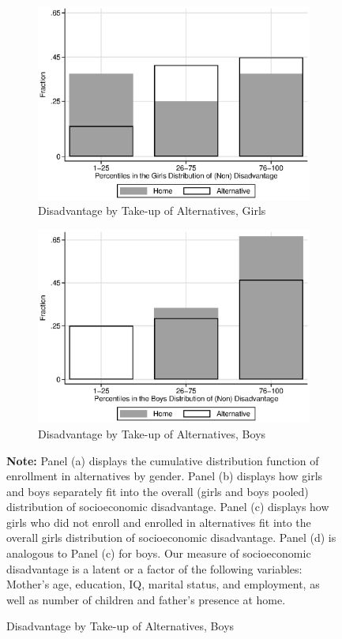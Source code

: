 \begin{figure}
\begin{subfigure}[h]{0.4\textwidth}
	\centering
	\caption{Disadvantage by Take-up of Alternatives, Girls} \label{figure:disadgirls}
	\includegraphics[width=\textwidth]{output/factorbase_wgirlscompare}
\end{subfigure}%
\begin{subfigure}[h]{0.4\textwidth}
	\centering
	\caption{Disadvantage by Take-up of Alternatives, Boys} \label{figure:disadboys}
	\includegraphics[width=\textwidth]{output/factorbase_wboyscompare}
\end{subfigure}
\footnotesize
\justify
\textbf{Note:} Panel (a) displays the cumulative distribution function of enrollment in alternatives by gender. Panel (b) displays how girls and boys separately fit into the overall (girls and boys pooled) distribution of socioeconomic disadvantage. Panel (c) displays how girls who did not enroll and enrolled in alternatives fit into the overall girls distribution of socioeconomic disadvantage. Panel (d) is analogous to Panel (c) for boys. Our measure of socioeconomic disadvantage is a latent or a factor of the following variables: Mother's age, education, IQ, marital status, and employment, as well as number of children and father's presence at home.
\end{figure}

